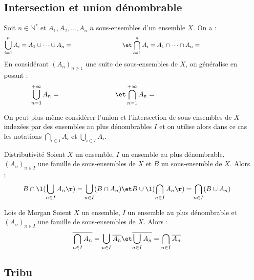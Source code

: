 \documentclass[a4paper,10pt]{report}
\begin{document}
\subsection{Intersection et union dénombrable}

Soit $n \in \mathbb{N}^*$ et $A_1, A_2, \ldots, A_n$ $n$ sous-ensembles d'un ensemble $X$. On a :
$$ \bigcup_{i=1}^n A_i = A_1 \cup \cdots \cup A_n =  \qquad \qquad \qquad \qquad \et \bigcap_{i=1}^n A_i = A_1 \cap \cdots \cap A_n =\qquad \qquad \qquad \qquad$$
En considérant $(A_n)_{n \geq 1}$ une suite de sous-ensembles de $X$, on généralise en posant :
$$ \bigcup_{n=1}^{+ \infty} A_n =  \qquad \qquad \qquad \qquad \et \bigcap_{n=1}^{+ \infty} A_n  =\qquad \qquad \qquad  \qquad\qquad$$

On peut plus même considérer l'union et l'intersection de sous ensembles de $X$ indexées par des ensembles au plus dénombrables $I$ et on utilise alors dans ce cas les notations $\bigcap_{i \in I} A_i$ et $\bigcup_{i \in I} A_i$.

\begin{Proposition}{Distributivité}
Soient  $X$ un ensemble, $I$ un ensemble au plus dénombrable, $(A_n)_{n\in I}$ une famille de sous-ensembles de $X$ et $B$ un sous-ensemble de $X$. Alors :
 $$ B \cap \l(\bigcup_{n\in I} A_n \r) = \bigcup_{n\in I} (B \cap A_n) \et  B \cup \l(\bigcap_{n\in I} A_n \r) = \bigcap_{n\in I} (B \cup A_n) $$
\end{Proposition}


\begin{Theoreme}{Lois de Morgan}
 Soient $X$ un ensemble, $I$ un ensemble au plus dénombrable et $(A_n)_{n\in I}$ une famille de sous-ensembles de $X$. Alors :
 $$ \overline{\bigcap_{n\in I} A_n} = \bigcup_{n\in I} \overline{A_n} \et \overline{\bigcup_{n\in I} A_n} = \bigcap_{n\in I} \overline{A_n}$$
\end{Theoreme}


\subsection{Tribu}
\end{document}
